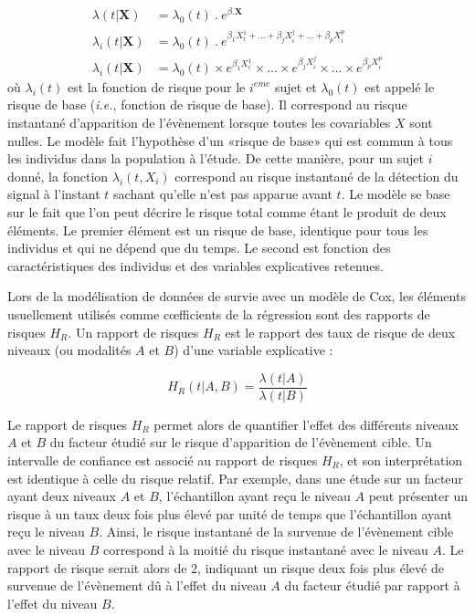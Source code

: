 \begin{align} 
\lambda(t|\textbf{X}) &= \lambda_0(t)~.~e^{\beta.\textbf{X}}\\
\lambda_{i} (t|\textbf{X}) &= \lambda_0(t)~.~e^{\beta_1 X_i^1 + \ldots + \beta_j X_i^j + \ldots + \beta_p X_i^p}\\
\lambda_{i} (t|\textbf{X}) &= \lambda_0(t) \times e^{\beta_1 X_i^1} \times \ldots \times e^{\beta_j X_i^j} \times \ldots \times e^{\beta_p X_i^p}
\end{align}
où $\lambda_i(t)$ est la fonction de risque pour le $i^{eme}$ sujet et $\lambda_0(t)$ est appelé le risque de base (\textit{i.e.}, fonction de risque de base). 
Il correspond au risque instantané d'apparition de l'évènement lorsque toutes les covariables $X$ sont nulles. 
Le modèle fait l'hypothèse d'un «risque de base» qui est commun à tous les individus dans la population à l'étude. 
De cette manière, pour un sujet $i$ donné, la fonction $\lambda_i(t,X_i)$ correspond au risque instantané de la détection du signal à l'instant $t$ sachant qu'elle n'est pas apparue avant $t$. 
Le modèle se base sur le fait que l'on peut décrire le risque total comme étant le produit de deux éléments. 
Le premier élément est un risque de base, identique pour tous les individus et qui ne dépend que du temps. 
Le second est fonction des caractéristiques des individus et des variables explicatives retenues. 

Lors de la modélisation de données de survie avec un modèle de Cox, les éléments usuellement utilisés comme cœfficients de la régression sont des rapports de risques $H_R$.
Un rapport de risques $H_R$ est le rapport des taux de risque de deux niveaux (ou modalités $A$ et $B$) d'une variable explicative : 

\begin{equation}
H_R(t|A,B) = \frac{\lambda(t|A)}{\lambda(t|B)}
\end{equation}

Le rapport de risques $H_R$ permet alors de quantifier l'effet des différents niveaux $A$ et $B$ du facteur étudié sur le risque d'apparition de l'évènement cible. 
Un intervalle de confiance est associé au rapport de risques $H_R$, et son interprétation est identique à celle du risque relatif. 
Par exemple, dans une étude sur un facteur ayant deux niveaux $A$ et $B$, l'échantillon ayant reçu le niveau $A$ peut présenter un risque à un taux deux fois plus élevé par unité de temps que l'échantillon ayant reçu le niveau $B$. 
Ainsi, le risque instantané de la survenue de l'évènement cible avec le niveau $B$ correspond à la moitié du risque instantané avec le niveau $A$. 
Le rapport de risque serait alors de 2, indiquant un risque deux fois plus élevé de survenue de l'évènement dû à l'effet du niveau $A$ du facteur étudié par rapport à l'effet du niveau $B$. 

